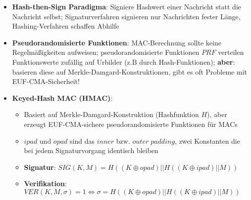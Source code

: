 \begin{itemize}
	\item \textbf{Hash-then-Sign Paradigma}: Signiere Hashwert einer Nachricht statt die Nachricht selbst; Signaturverfahren signieren nur Nachrichten fester Länge, Hashing-Verfahren schaffen Abhilfe
	\item \textbf{Pseudorandomisierte Funktionen}: MAC-Berechnung sollte keine Regelmäßigkeiten aufweisen; pseudorandomisierte Funktionen $PRF$ verteilen Funktionswerte zufällig auf Urbilder (z.B durch Hash-Funktionen); \textbf{aber}: basieren diese auf Merkle-Damgard-Konstruktionen, gibt es oft Probleme mit EUF-CMA-Sicherheit!
	\item \textbf{Keyed-Hash MAC (HMAC)}:
	\begin{itemize}
		\item Basiert auf Merkle-Damgard-Konstruktion (Hashfunktion $H$), aber erzeugt EUF-CMA-sichere pseudorandomisierte Funktionen für MACs
		\item $ipad$ und $opad$ sind das $inner$ bzw. $outer\;padding$, zwei Konstanten die bei jedem Signaturvorgang identisch bleiben
		\item \textbf{Signatur}: $SIG(K, M) = H((K \oplus \textit{opad})||H((K \oplus \textit{ipad})|| M))$
		\item \textbf{Verifikation}: $VER(K, M, \sigma) = 1 \Leftrightarrow \sigma = H((K \oplus \textit{opad})|| H((K \oplus \textit{ipad})|| M))$
	\end{itemize}
\end{itemize}